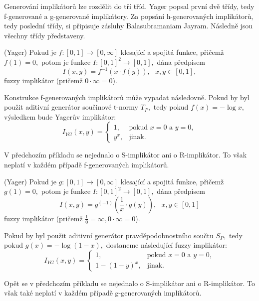 Generování implikátor\r u lze rozdělit do tří tříd. Yager popsal první dvě třídy, tedy f-generované a g-generované implikátory. Za popsání  h-generovaných implikátor\r u, tedy poslední třídy, si připisuje zásluhy Balasubramaniam Jayram. Následně jsou všechny třídy představeny.

\begin{sentence}(Yager) 
Pokud je $f: [0,1] \to [0,\infty]$ klesající a spojitá funkce,
přičemž $f(1) = 0,$ potom je funkce $I: [0,1]^2 \to [0,1],$ dána předpisem
$$I(x,y) = f^{-1}(x \cdot f(y)), \mbox {   } x, y \in [0,1],$$
fuzzy implikátor (pričemž $0 \cdot \infty = 0$). \\
\end{sentence}

\begin{example}
    \cite{hlinena}
    Konstrukce f-generovaných implikátor\r u m\r uže vypadat následovně.
    Pokud by byl použit aditivní generátor součinové t-normy $T_P,$ tedy 
    pokud $f(x) = - \log x,$ výsledkem bude Yager\r uv implikátor:
    $$I_{YG}(x,y)= \begin{cases} 1,
    &\mbox {pokud $x=0$ a $y=0,$} \\
    y^x, &\mbox {jinak.}
    \end{cases}$$
\end{example}
\begin{remark}
    V předchozím příkladu se nejednalo o S-implikátor ani o R-implikátor. To však neplatí v každém případě f-generovaných implikátor\r u.
\end{remark}


\begin{sentence}(Yager) 
Pokud je $g: [0,1] \to [0,\infty]$ klesající a spojitá funkce,
přičemž $g(1) = 0,$ potom je funkce $I: [0,1]^2 \to [0,1],$ dána předpisem
$$I(x,y) = g^{(-1)}\left (\frac 1x \cdot g(y)\right ), \mbox {   } x, y \in [0,1]$$
fuzzy implikátor (pričemž $\frac{1}{0} = \infty, 0 \cdot \infty = 0$). \\
\end{sentence}
\begin{example}
    \cite{hlinena}
    Pokud by byl použit aditivní generátor pravděpodobnostního součtu $S_P,$ tedy 
    pokud $g(x) = - \log (1- x),$ dostaneme následující fuzzy implikátor:
    $$I_{YG}(x,y)= \begin{cases} 1,
    &\mbox {pokud $x=0$ a $y=0,$} \\
    1-(1-y)^x, &\mbox {jinak.}
        \end{cases}$$
\end{example}
\begin{remark}
    Opět se v předchozím příkladu se nejednalo o S-implikátor ani o R-implikátor. To však také neplatí v každém případě g-generovaných implikátor\r u.
\end{remark}

